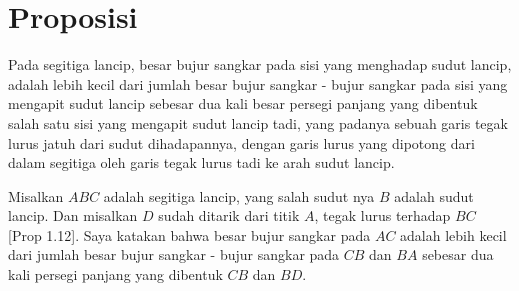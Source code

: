 \documentclass[a4paper]{book}
\begin{document}
\section*{\centering Proposisi \thesection} 

Pada segitiga lancip, besar bujur sangkar pada sisi yang menghadap sudut 
lancip, adalah lebih kecil dari jumlah besar bujur sangkar - bujur sangkar 
pada sisi yang mengapit sudut lancip sebesar dua kali besar persegi panjang
yang dibentuk salah satu sisi yang mengapit sudut lancip tadi, yang padanya sebuah
garis tegak lurus jatuh dari sudut dihadapannya, dengan garis lurus yang dipotong dari dalam segitiga oleh
garis tegak lurus tadi ke arah sudut lancip.

\begin{center}
\end{center}

Misalkan $ABC$ adalah segitiga lancip, yang salah sudut nya $B$ adalah sudut
lancip. Dan misalkan $D$ sudah ditarik dari titik $A$, tegak lurus terhadap 
$BC$ [Prop 1.12]. Saya katakan bahwa besar bujur sangkar pada $AC$ adalah 
lebih kecil dari jumlah besar bujur sangkar - bujur sangkar pada $CB$ dan 
$BA$ sebesar dua kali persegi panjang yang dibentuk $CB$ dan $BD$.
\end{document}
